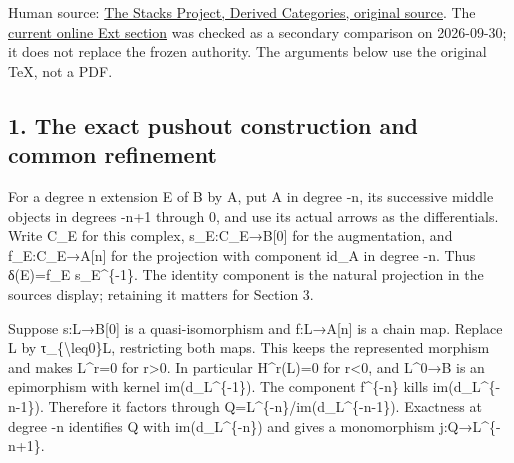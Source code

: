 \documentclass[11pt]{article}
\begin{document}
Human source:\allowbreak{} \href{https://github.com/stacks/stacks-project/blob/a04446e57ec1fbc252a871afcec7752fb2807b14/derived.tex\#L8774}{The Stacks Project,\allowbreak{} Derived Categories,\allowbreak{} original source}. The \href{https://stacks.math.columbia.edu/tag/06XP}{current online Ext section} was checked as a secondary comparison on 2026-09-30; it does not replace the frozen authority. The arguments below use the original TeX,\allowbreak{} not a PDF.

\subsection{1. The exact pushout construction and common refinement}\label{proofs-8774-9196-the-exact-pushout-construction-and-common-refinement}

For a degree n extension E of B by A,\allowbreak{} put A in degree -n,\allowbreak{} its successive middle objects in degrees -n\allowbreak{}+1 through 0,\allowbreak{} and use its actual arrows as the differentials. Write C\_\allowbreak{}E for this complex,\allowbreak{} s\_\allowbreak{}E:\allowbreak{}C\_\allowbreak{}E\allowbreak{}→B[0]\allowbreak{} for the augmentation,\allowbreak{} and f\_\allowbreak{}E:\allowbreak{}C\_\allowbreak{}E\allowbreak{}→A[n]\allowbreak{} for the projection with component id\_\allowbreak{}A in degree -n. Thus δ(E)\allowbreak{}\allowbreak{}=f\_\allowbreak{}E s\_\allowbreak{}E\textasciicircum{}\{-1\}. The identity component is the natural projection in the source\textquotesingle s display; retaining it matters for Section 3.

Suppose s:\allowbreak{}L\allowbreak{}→B[0]\allowbreak{} is a quasi-isomorphism and f:\allowbreak{}L\allowbreak{}→A[n]\allowbreak{} is a chain map. Replace L by τ\_\allowbreak{}\{\textbackslash{}leq0\}L,\allowbreak{} restricting both maps. This keeps the represented morphism and makes L\textasciicircum{}r\allowbreak{}=0 for r\textgreater0. In particular H\textasciicircum{}r(L)\allowbreak{}\allowbreak{}=0 for r<0,\allowbreak{} and L\textasciicircum{}0\allowbreak{}→B is an epimorphism with kernel im(d\_\allowbreak{}L\textasciicircum{}\{-1\})\allowbreak{}. The component f\^{}\{-n\} kills im(d\_\allowbreak{}L\textasciicircum{}\{-n-1\})\allowbreak{}. Therefore it factors through Q\allowbreak{}=L\textasciicircum{}\{-n\}/\allowbreak{}im(d\_\allowbreak{}L\textasciicircum{}\{-n-1\})\allowbreak{}. Exactness at degree -n identifies Q with im(d\_\allowbreak{}L\textasciicircum{}\{-n\})\allowbreak{} and gives a monomorphism j:\allowbreak{}Q\allowbreak{}→L\textasciicircum{}\{-n\allowbreak{}+1\}.
\end{document}
